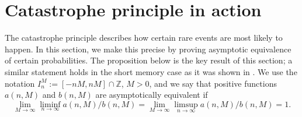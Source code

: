 \documentclass[11pt,reqno]{amsart}
\numberwithin{equation}{section}
\theoremstyle{definition}
\theoremstyle{remark}
\newtheorem{remark}{Remark}[section]
\theoremstyle{definition}
\newcommand{\eps}{\varepsilon}
\begin{document}


\section{Catastrophe principle in action}\label{sec:prop_2_prob_equi}

The catastrophe principle describes how certain rare events are most
likely to happen. In this section, we make this precise by proving
asymptotic equivalence of certain probabilities. The proposition below
is the key result of this section; a similar statement holds in the
short memory case as it was shown in \cite{wang:samorodnitsky:2025}.
We use the notation $I_n^M := 
[-nM,nM]\cap\mathbb{Z}$, $M>0$, and we say that positive functions
$a(n,M)$ and $b(n,M)$ are asymptotically equivalent if
$$
\lim_{M\to\infty} \liminf_{n\to\infty} a(n,M)/b(n,M)=
\lim_{M\to\infty} \limsup_{n\to\infty} a(n,M)/b(n,M)=1.
$$
\end{document}
